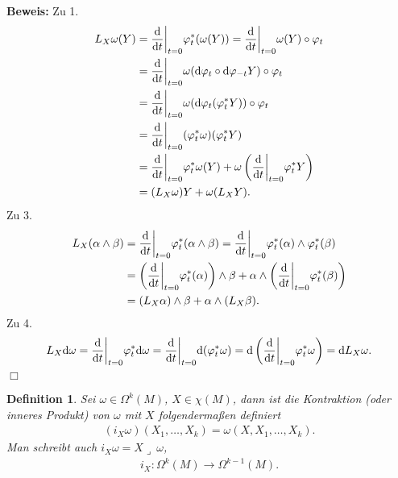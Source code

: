\documentclass[12pt,a4paper]{article}
\newtheorem{Definition}[Lemma]{Definition}
\def\proof{\noindent\textbf{Beweis:}\quad}
\def\qed{\quad\hfill\ensuremath{\Box}}
\begin{document}
\proof
Zu 1. 
\begin{align*}
L_X\omega(Y) &= \frac{\mathrm{d}}{\mathrm{d}t}\bigg|_{t=0} \varphi_t^*(\omega(Y)) =
 \frac{\mathrm{d}}{\mathrm{d}t}\bigg|_{t=0}
 \omega(Y)\circ\varphi_t\\
 &= \frac{\mathrm{d}}{\mathrm{d}t}\bigg|_{t=0}
 \omega(\mathrm{d}\varphi_t\circ\mathrm{d}\varphi_{-t} Y)\circ\varphi_t\\
 &= \frac{\mathrm{d}}{\mathrm{d}t}\bigg|_{t=0}
 \omega(\mathrm{d}\varphi_{t}(\varphi_t^* Y))\circ\varphi_t\\
 &= \frac{\mathrm{d}}{\mathrm{d}t}\bigg|_{t=0}
 (\varphi_t^*\omega)(\varphi_t^* Y)\\
 &= \frac{\mathrm{d}}{\mathrm{d}t}\bigg|_{t=0}
 \varphi_t^*\omega(Y) + 
 \omega\left(\frac{\mathrm{d}}{\mathrm{d}t}\bigg|_{t=0}\varphi_t^* Y\right)\\
 &= (L_X\omega)Y + \omega(L_X Y).
\end{align*}
Zu 3.
\begin{align*}
L_X(\alpha\wedge \beta) &= \frac{\mathrm{d}}{\mathrm{d}t}\bigg|_{t=0}
\varphi_t^*(\alpha\wedge\beta)
 = \frac{\mathrm{d}}{\mathrm{d}t}\bigg|_{t=0}
\varphi_t^*(\alpha)\wedge\varphi_t^*(\beta)\\
&= \left(\frac{\mathrm{d}}{\mathrm{d}t}\bigg|_{t=0}
\varphi_t^*(\alpha)\right)\wedge \beta +
\alpha\wedge\left( 
\frac{\mathrm{d}}{\mathrm{d}t}\bigg|_{t=0}
\varphi_t^*(\beta)\right)\\
&= (L_X\alpha) \wedge\beta + \alpha\wedge(L_X\beta).
\end{align*}
Zu 4.
\begin{align*}
L_X \mathrm{d}\omega = \frac{\mathrm{d}}{\mathrm{d}t}\bigg|_{t=0} \varphi_t^* \mathrm{d}\omega =
\frac{\mathrm{d}}{\mathrm{d}t}\bigg|_{t=0} \mathrm{d}(\varphi_t^* \omega) =
\mathrm{d}\left(\frac{\mathrm{d}}{\mathrm{d}t}\bigg|_{t=0} \varphi_t^* \omega\right) =
\mathrm{d} L_X\omega.
\end{align*}
\qed

\bigskip

\begin{Definition}
Sei $\omega\in\Omega^k(M)$, $X\in\chi(M)$, dann ist die \emph{Kontraktion}
(oder \emph{inneres Produkt}) von $\omega$ mit $X$ folgenderma\ss{}en definiert
\begin{align*}
(i_X\omega)(X_1,\ldots,X_k) = \omega(X,X_1,\ldots,X_k).
\end{align*}
Man schreibt auch $i_X\omega = X\lrcorner\ \omega$,
\begin{align*}
i_X: \Omega^k(M)\to \Omega^{k-1}(M).
\end{align*}
\end{Definition}
\end{document}
